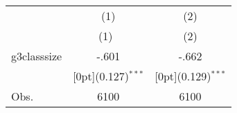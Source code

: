 \begin{tabular*}{\textwidth}{@{\extracolsep{\fill}}lcc}		
	& \multicolumn{1}{c}{(1)} &	\multicolumn{1}{c}{(2)} \\
\cline{2-3}		
	& \multicolumn{1}{c}{(1)\mbox{\ }} &	\multicolumn{1}{c}{(2)} \\
\hline		
g3classsize &	-.601 &	-.662 \\
&	\raisebox{.7ex}[0pt]{\scriptsize (0.127)$^{***}$} &	\raisebox{.7ex}[0pt]{\scriptsize (0.129)$^{***}$} \\
Obs. &	6100 &	6100 \\
\hline\hline		
\end{tabular*}%
